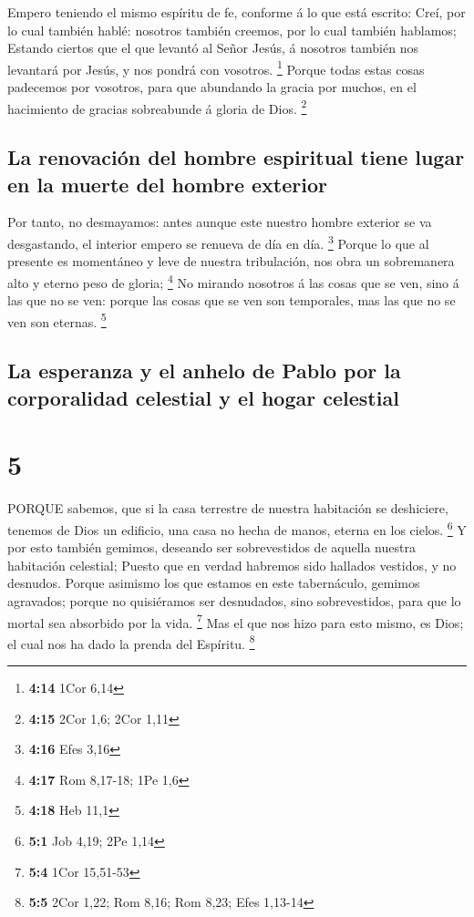  Empero teniendo el mismo espíritu de fe, conforme á lo que
está escrito: Creí, por lo cual también hablé: nosotros también creemos,
por lo cual también hablamos;  Estando ciertos que el que
levantó al Señor Jesús, á nosotros también nos levantará por Jesús, y
nos pondrá con vosotros. \footnote{\textbf{4:14} 1Cor 6,14}
 Porque todas estas cosas padecemos por vosotros, para que
abundando la gracia por muchos, en el hacimiento de gracias sobreabunde
á gloria de Dios. \footnote{\textbf{4:15} 2Cor 1,6; 2Cor 1,11}

\hypertarget{la-renovaciuxf3n-del-hombre-espiritual-tiene-lugar-en-la-muerte-del-hombre-exterior}{%
\subsection{La renovación del hombre espiritual tiene lugar en la muerte
del hombre
exterior}\label{la-renovaciuxf3n-del-hombre-espiritual-tiene-lugar-en-la-muerte-del-hombre-exterior}}

 Por tanto, no desmayamos: antes aunque este nuestro hombre
exterior se va desgastando, el interior empero se renueva de día en día.
\footnote{\textbf{4:16} Efes 3,16}  Porque lo que al
presente es momentáneo y leve de nuestra tribulación, nos obra un
sobremanera alto y eterno peso de gloria; \footnote{\textbf{4:17} Rom
  8,17-18; 1Pe 1,6}  No mirando nosotros á las cosas que se
ven, sino á las que no se ven: porque las cosas que se ven son
temporales, mas las que no se ven son eternas. \footnote{\textbf{4:18}
  Heb 11,1}

\hypertarget{la-esperanza-y-el-anhelo-de-pablo-por-la-corporalidad-celestial-y-el-hogar-celestial}{%
\subsection{La esperanza y el anhelo de Pablo por la corporalidad
celestial y el hogar
celestial}\label{la-esperanza-y-el-anhelo-de-pablo-por-la-corporalidad-celestial-y-el-hogar-celestial}}

\hypertarget{section-4}{%
\section{5}\label{section-4}}

 PORQUE sabemos, que si la casa terrestre de nuestra
habitación se deshiciere, tenemos de Dios un edificio, una casa no hecha
de manos, eterna en los cielos. \footnote{\textbf{5:1} Job 4,19; 2Pe
  1,14}  Y por esto también gemimos, deseando ser
sobrevestidos de aquella nuestra habitación celestial; 
Puesto que en verdad habremos sido hallados vestidos, y no desnudos.
 Porque asimismo los que estamos en este tabernáculo,
gemimos agravados; porque no quisiéramos ser desnudados, sino
sobrevestidos, para que lo mortal sea absorbido por la vida. \footnote{\textbf{5:4}
  1Cor 15,51-53}  Mas el que nos hizo para esto mismo, es
Dios; el cual nos ha dado la prenda del Espíritu. \footnote{\textbf{5:5}
  2Cor 1,22; Rom 8,16; Rom 8,23; Efes 1,13-14}

